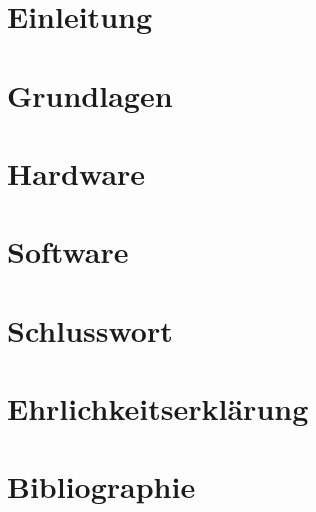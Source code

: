 \documentclass[10pt,a4paper,oneside]{99_fhnwreport}
\begin{document}
\section{Einleitung}\label{sec:einleitung}

\clearpage

\section{Grundlagen}\label{sec:grundlagen}

\clearpage

\section{Hardware}\label{sec:hardware}

\clearpage


\section{Software}\label{sec:software}

\clearpage

\section{Schlusswort}\label{sec:schlusswort}

\clearpage

\section{Ehrlichkeitserklärung}\label{sec:ehrlichkeitserklärung}

\clearpage

\section{Bibliographie}\label{sec:bibliographie}

\clearpage

\begin{appendix}

\end{appendix}
\end{document}
